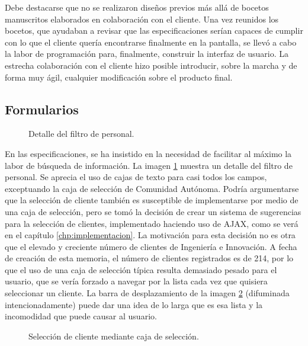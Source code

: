 Debe destacarse que no se realizaron diseños previos más allá de bocetos
manuscritos elaborados en colaboración con el cliente. Una vez reunidos los
bocetos, que ayudaban a revisar que las especificaciones serían capaces de
cumplir con lo que el cliente quería encontrarse finalmente en la pantalla, se
llevó a cabo la labor de programación para, finalmente, construir la interfaz
de usuario. La estrecha colaboración con el cliente hizo posible introducir,
sobre la marcha y de forma muy ágil, cualquier modificación sobre el producto
final.

\subsection{Formularios}

\begin{figure}
\centering
{}
\caption{Detalle del filtro de personal.}
\label{fig:detalle_filtro_personal}
\end{figure}

En las especificaciones, se ha insistido en la necesidad de facilitar al máximo
la labor de búsqueda de información. La imagen \ref{fig:detalle_filtro_personal}
muestra un detalle del filtro de personal. Se aprecia el uso de cajas de texto
para casi todos los campos, exceptuando la caja de selección de Comunidad
Autónoma. Podría argumentarse que la selección de cliente también es susceptible
de implementarse por medio de una caja de selección, pero se tomó la decisión de
crear un sistema de sugerencias para la selección de clientes, implementado
haciendo uso de AJAX, como se verá en el capítulo \ref{chp:implementacion}. La
motivación para esta decisión no es otra que el elevado y creciente número de
clientes de Ingeniería e Innovación. A fecha de creación de esta memoria, el
número de clientes registrados es de 214, por lo que el uso de una caja de
selección típica resulta demasiado pesado para el usuario, que se vería forzado
a navegar por la lista cada vez que quisiera seleccionar un cliente. La barra de
desplazamiento de la imagen \ref{fig:seleccion_cliente_old} (difuminada
intencionadamente) puede dar una idea
de lo larga que es esa lista y la incomodidad que puede causar al usuario.

\begin{figure}
\centering
{}
\caption{Selección de cliente mediante caja de selección.}
\label{fig:seleccion_cliente_old}
\end{figure}

